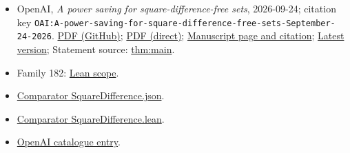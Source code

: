 \documentclass[11pt]{article}
\begin{document}
\begin{itemize}
\item OpenAI, \emph{A power saving for square-difference-free sets}, 2026-09-24; citation key \texttt{OAI:A-power-saving-for-square-difference-free-sets-September-24-2026}. \href{https://github.com/openai/math/blob/adc7f1241b42e322a6451854ab7e4b4c146bf78a/preprints/A-power-saving-for-square-difference-free-sets-September-24-2026/paper.pdf}{PDF (GitHub)}; \href{https://github.com/openai/math/raw/adc7f1241b42e322a6451854ab7e4b4c146bf78a/preprints/A-power-saving-for-square-difference-free-sets-September-24-2026/paper.pdf}{PDF (direct)}; \href{https://github.com/openai/math/blob/adc7f1241b42e322a6451854ab7e4b4c146bf78a/preprints/A-power-saving-for-square-difference-free-sets-September-24-2026/README.md}{Manuscript page and citation}; \href{https://github.com/openai/math/blob/main/preprints/A-power-saving-for-square-difference-free-sets-September-24-2026/paper.pdf}{Latest version}; Statement source: \href{https://github.com/openai/math/blob/adc7f1241b42e322a6451854ab7e4b4c146bf78a/preprints/A-power-saving-for-square-difference-free-sets-September-24-2026/build/sections/introduction.tex\#L15}{thm:main}.
\item Family 182: \href{https://github.com/openai/math/blob/adc7f1241b42e322a6451854ab7e4b4c146bf78a/lean/docs/182.md}{Lean scope}.
\item \href{https://github.com/openai/math/blob/adc7f1241b42e322a6451854ab7e4b4c146bf78a/lean/ComparatorChallenges/SquareDifference.json}{Comparator SquareDifference.json}.
\item \href{https://github.com/openai/math/blob/adc7f1241b42e322a6451854ab7e4b4c146bf78a/lean/ComparatorChallenges/SquareDifference.lean}{Comparator SquareDifference.lean}.
\item \href{https://github.com/openai/math/blob/adc7f1241b42e322a6451854ab7e4b4c146bf78a/CONTENTS.md}{OpenAI catalogue entry}.
\end{itemize}
\end{document}
